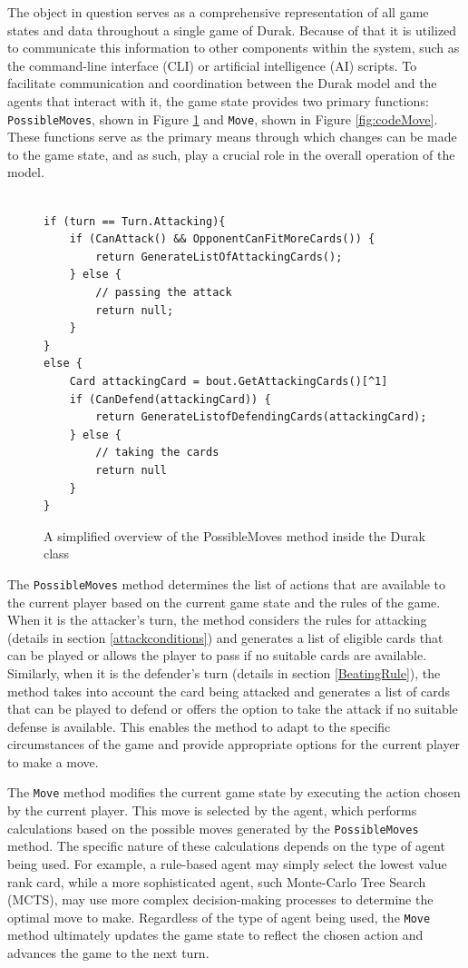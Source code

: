 The object in question serves as a comprehensive representation of all game states and data throughout a single game of Durak. Because of that it is utilized to communicate this information to other components within the system, such as the command-line interface (CLI) or artificial intelligence (AI) scripts. To facilitate communication and coordination between the Durak model and the agents that interact with it, the game state provides two primary functions: \texttt{PossibleMoves}, shown in Figure \ref{fig:codePossibleMoves} and \texttt{Move}, shown in Figure \ref{fig:codeMove}. These functions serve as the primary means through which changes can be made to the game state, and as such, play a crucial role in the overall operation of the model. 

\begin{figure}[h]
\captionsetup{justification=centering}
\lstset{basicstyle=\ttfamily\scriptsize}
\begin{lstlisting}[frame=single]

if (turn == Turn.Attacking){
	if (CanAttack() && OpponentCanFitMoreCards()) {
		return GenerateListOfAttackingCards();
	} else {
		// passing the attack
		return null;	
	}
}
else {
	Card attackingCard = bout.GetAttackingCards()[^1]
	if (CanDefend(attackingCard)) {
		return GenerateListofDefendingCards(attackingCard);
	} else {
		// taking the cards
		return null
	}
}
\end{lstlisting}
\caption{A simplified overview of the PossibleMoves method inside the Durak class}
\label{fig:codePossibleMoves}
\end{figure}

The \texttt{PossibleMoves} method determines the list of actions that are available to the current player based on the current game state and the rules of the game. When it is the attacker's turn, the method considers the rules for attacking (details in section \ref{attackconditions}) and generates a list of eligible cards that can be played or allows the player to pass if no suitable cards are available. Similarly, when it is the defender's turn (details in section \ref{BeatingRule}), the method takes into account the card being attacked and generates a list of cards that can be played to defend or offers the option to take the attack if no suitable defense is available. This enables the method to adapt to the specific circumstances of the game and provide appropriate options for the current player to make a move.

The \texttt{Move} method modifies the current game state by executing the action chosen by the current player. This move is selected by the agent, which performs calculations based on the possible moves generated by the \texttt{PossibleMoves} method. The specific nature of these calculations depends on the type of agent being used. For example, a rule-based agent may simply select the lowest value rank card, while a more sophisticated agent, such Monte-Carlo Tree Search (MCTS), may use more complex decision-making processes to determine the optimal move to make. Regardless of the type of agent being used, the \texttt{Move} method ultimately updates the game state to reflect the chosen action and advances the game to the next turn.

